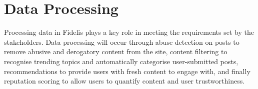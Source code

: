 \section{Data Processing}
Processing data in Fidelis plays a key role in meeting the requirements set by the stakeholders. Data processing will occur through abuse detection on posts to remove abusive and derogatory content from the site, content filtering to recognise trending topics and automatically categorise user-submitted posts, recommendations to provide users with fresh content to engage with, and finally reputation scoring to allow users to quantify content and user trustworthiness.




